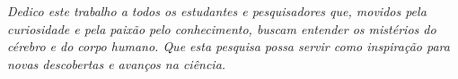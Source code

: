 \begin{dedicatoria}
   \vspace*{\fill}
   \centering
   \noindent
   \textit{Dedico este trabalho a todos os estudantes e pesquisadores que, movidos pela curiosidade e pela paixão pelo conhecimento, buscam entender os mistérios do cérebro e do corpo humano. Que esta pesquisa possa servir como inspiração para novas descobertas e avanços na ciência.} \vspace*{\fill}
\end{dedicatoria}